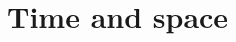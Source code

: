 \documentclass[a4paper,12pt,%
onecolumn,oneside,%
british%
]{memoir}
\renewcommand*{\|}[1][]{\nonscript\:#1\vert\nonscript\:\mathopen{}}
\begin{document}
















\printpagenotes*
\cleartooddpage
\chapter{Time and space}
\label{cha:time_space}
\setcounter{section}{-1}
\end{document}
